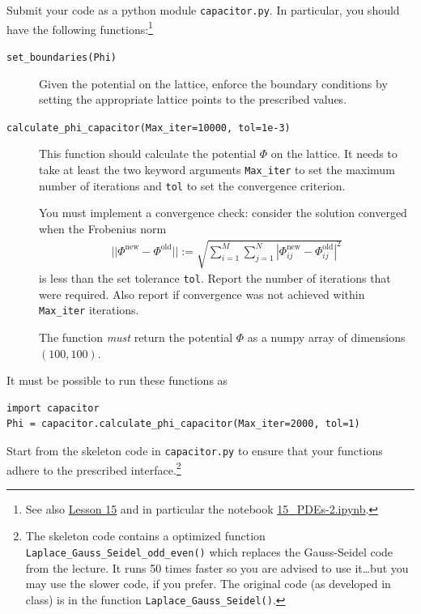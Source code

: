 \documentclass[letterpaper]{scrartcl}
\begin{document}
Submit your code as a python module \texttt{capacitor.py}. In
particular, you should have the following functions:\footnote{See also
  \href{https://asu-compmethodsphysics-phy494.github.io/ASU-PHY494//2020/04/14/15_PDEs/}{Lesson 15} and in particular the notebook
  \href{http://nbviewer.jupyter.org/github/ASU-CompMethodsPhysics-PHY494/PHY494-resources/blob/master/15_PDEs/15_PDEs-2.ipynb}{15\_PDEs-2.ipynb}.}
\begin{description}
\item[\texttt{set\_boundaries(Phi)}] Given the potential on the
  lattice, enforce the boundary conditions by setting the appropriate
  lattice points to the prescribed values.
\item[\texttt{calculate\_phi\_capacitor(Max\_iter=10000, tol=1e-3)}] This
  function should calculate the potential $\Phi$ on the lattice. It
  needs to take at least the two keyword arguments \texttt{Max\_iter}
  to set the maximum number of iterations and \texttt{tol} to set the
  convergence criterion.

  You must implement a convergence check: consider the solution
  converged when the Frobenius norm
  \begin{gather}
    ||\Phi^{\text{new}} - \Phi^{\text{old}}|| :=
    \sqrt{\sum_{i=1}^{M}\sum_{j=1}^{N} \left|\Phi^{\text{new}}_{ij} -
        \Phi^{\text{old}}_{ij}\right|^{2}}
    \label{eq:Frobeniusnorm}    
  \end{gather}
  is less than the set tolerance \texttt{tol}. Report the
  number of iterations that were required. Also report if convergence
  was not achieved within \texttt{Max\_iter} iterations.

  The function \emph{must} return the potential $\Phi$ as a numpy
  array of dimensions $(100, 100)$.
\end{description}
It must be possible to run these functions as
\begin{verbatim}
import capacitor
Phi = capacitor.calculate_phi_capacitor(Max_iter=2000, tol=1)
\end{verbatim}

Start from the skeleton code in \texttt{capacitor.py} to ensure that
your functions adhere to the prescribed interface.\footnote{The
  skeleton code contains a optimized function
  \texttt{Laplace\_Gauss\_Seidel\_odd\_even()} which replaces the
  Gauss-Seidel code from the lecture. It runs 50 times faster so you
  are advised to use it\dots but you may use the slower code, if you
  prefer. The original code (as developed in class) is in the function
  \texttt{Laplace\_Gauss\_Seidel()}.}
\end{document}
